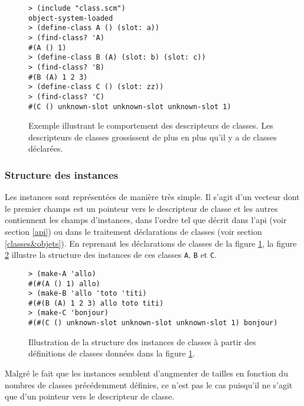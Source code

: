 \documentclass[letterpaper,12pt]{book}
\begin{document}
      \begin{figure}[h!]
        \begin{lstlisting}
> (include "class.scm")
object-system-loaded
> (define-class A () (slot: a))
> (find-class? 'A)
#(A () 1)
> (define-class B (A) (slot: b) (slot: c))
> (find-class? 'B)
#(B (A) 1 2 3)
> (define-class C () (slot: zz))
> (find-class? 'C)
#(C () unknown-slot unknown-slot unknown-slot 1)
        \end{lstlisting}
        \caption{Exemple illustrant le comportement des descripteurs de
          classes. Les descripteurs de classes grossissent de plus en
          plus qu'il y a de classes déclarées.}
        \label{ex-cdesc}
      \end{figure}

    \subsubsection{Structure des instances}
      \label{inst-struct}
      Les instances sont représentées de manière très simple. Il
      s'agit d'un vecteur dont le premier champs est un pointeur vers
      le descripteur de classe et les autres contiennent les champs
      d'instances, dans l'ordre tel que décrit dans l'api (voir
      section \ref{api}) ou dans le traitement déclarations de classes
      (voir section \ref{classes&objets}). En reprenant les
      déclarations de classes de la figure \ref{ex-cdesc}, la figure
      \ref{ex-struct-inst} illustre la structure des instances de ces
      classes \texttt{A}, \texttt{B} et \texttt{C}.

      \begin{figure}[h!]
        \begin{lstlisting}
> (make-A 'allo)
#(#(A () 1) allo)
> (make-B 'allo 'toto 'titi)
#(#(B (A) 1 2 3) allo toto titi)
> (make-C 'bonjour)
#(#(C () unknown-slot unknown-slot unknown-slot 1) bonjour)
        \end{lstlisting}
        \caption{Illustration de la structure des instances de classes à
          partir des définitions de classes données dans la figure
          \ref{ex-cdesc}.}
        \label{ex-struct-inst}
      \end{figure}

      Malgré le fait que les instances semblent d'augmenter de tailles
      en fonction du nombres de classes précédemment définies, ce n'est
      pas le cas puisqu'il ne s'agit que d'un pointeur vers le
      descripteur de classe.
\end{document}
